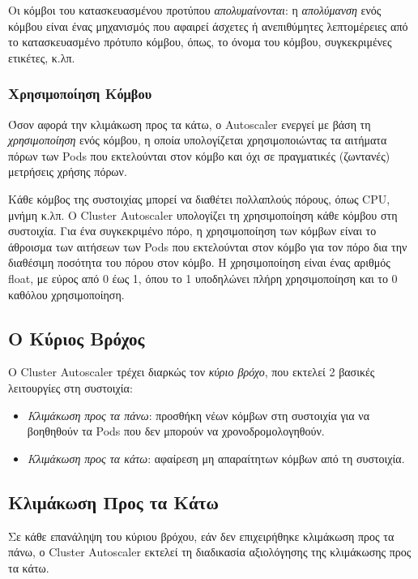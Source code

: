 Οι κόμβοι του κατασκευασμένου προτύπου \textit{απολυμαίνονται}: η
\textit{απολύμανση} ενός κόμβου είναι ένας μηχανισμός που αφαιρεί άσχετες ή
ανεπιθύμητες λεπτομέρειες από το κατασκευασμένο πρότυπο κόμβου, όπως, το όνομα
του κόμβου, συγκεκριμένες ετικέτες, κ.λπ.



\subsubsection{Χρησιμοποίηση Κόμβου}


Όσον αφορά την κλιμάκωση προς τα κάτω, ο Autoscaler ενεργεί με βάση τη
\textit{χρησιμοποίηση} ενός κόμβου, η οποία υπολογίζεται χρησιμοποιώντας τα
αιτήματα πόρων των Pods που εκτελούνται στον κόμβο και όχι σε πραγματικές
(ζωντανές) μετρήσεις χρήσης πόρων.

Κάθε κόμβος της συστοιχίας μπορεί να διαθέτει πολλαπλούς πόρους, όπως CPU, μνήμη
κ.λπ. Ο Cluster Autoscaler υπολογίζει τη χρησιμοποίηση κάθε κόμβου στη
συστοιχία. Για ένα συγκεκριμένο πόρο, η χρησιμοποίηση των κόμβων είναι το
άθροισμα των αιτήσεων των Pods που εκτελούνται στον κόμβο για τον πόρο δια την
διαθέσιμη ποσότητα του  πόρου στον κόμβο.  Η χρησιμοποίηση είναι ένας αριθμός
float, με εύρος από 0 έως 1, όπου το 1 υποδηλώνει πλήρη χρησιμοποίηση και το 0
καθόλου χρησιμοποίηση.

\subsection{Ο Κύριος Βρόχος}
Ο Cluster Autoscaler τρέχει διαρκώς τον \textit{κύριο βρόχο},  που εκτελεί 2 βασικές
λειτουργίες στη συστοιχία:
\begin{itemize}
      \tightlist
      \item \textit{Κλιμάκωση προς τα πάνω}: προσθήκη νέων κόμβων στη συστοιχία
            για να βοηθηθούν τα Pods που δεν μπορούν να χρονοδρομολογηθούν.
      \item \textit{Κλιμάκωση προς τα κάτω}: αφαίρεση μη απαραίτητων κόμβων από
            τη συστοιχία.
\end{itemize}

\subsection{Κλιμάκωση Προς τα Κάτω}
Σε κάθε επανάληψη του κύριου βρόχου, εάν δεν επιχειρήθηκε κλιμάκωση προς τα
πάνω, ο Cluster Autoscaler εκτελεί τη διαδικασία αξιολόγησης της κλιμάκωσης προς
τα κάτω.

